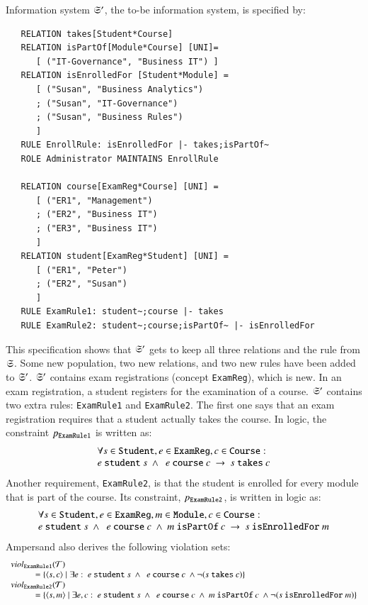 \documentclass{elsarticle}
\begin{document}
   Information system $\mathfrak{S}'$, the to-be information system, is specified by:
\begin{verbatim}
   RELATION takes[Student*Course]
   RELATION isPartOf[Module*Course] [UNI]=
      [ ("IT-Governance", "Business IT") ]
   RELATION isEnrolledFor [Student*Module] =
      [ ("Susan", "Business Analytics")
      ; ("Susan", "IT-Governance")
      ; ("Susan", "Business Rules")
      ]
   RULE EnrollRule: isEnrolledFor |- takes;isPartOf~
   ROLE Administrator MAINTAINS EnrollRule
   
   RELATION course[ExamReg*Course] [UNI] =
      [ ("ER1", "Management")
      ; ("ER2", "Business IT")
      ; ("ER3", "Business IT")
      ]
   RELATION student[ExamReg*Student] [UNI] =
      [ ("ER1", "Peter")
      ; ("ER2", "Susan")
      ]
   RULE ExamRule1: student~;course |- takes
   RULE ExamRule2: student~;course;isPartOf~ |- isEnrolledFor
\end{verbatim}
   This specification shows that $\mathfrak{S}'$ gets to keep all three relations and the rule from $\mathfrak{S}$.
   Some new population, two new relations, and two new rules have been added to $\mathfrak{S}'$.
   $\mathfrak{S}'$ contains exam registrations (concept \verb-ExamReg-), which is new.
   In an exam registration, a student registers for the examination of a course.
   $\mathfrak{S}'$ contains two extra rules: \verb-ExamRule1- and \verb-ExamRule2-.
   The first one says that an exam registration requires that a student actually takes the course.
   In logic, the constraint $p_{\tt ExamRule1}$ is written as:
\[\begin{array}{l}\forall s\in\text{\tt Student}, e\in\text{\tt ExamReg}, c\in\text{\tt Course}:\\
   e\ \text{\tt student}\ s\ \wedge\ \ e\ \text{\tt course}\ c\ \rightarrow\ s\ \text{\tt takes}\ c\\
\end{array}\]
   Another requirement, \verb-ExamRule2-, is that the student is enrolled for every module that is part of the course.
   Its constraint, $p_{\tt ExamRule2}$, is written in logic as:
\[\begin{array}{l}\forall s\in\text{\tt Student}, e\in\text{\tt ExamReg}, m\in\text{\tt Module}, c\in\text{\tt Course}:\\
   e\ \text{\tt student}\ s\ \wedge\ \ e\ \text{\tt course}\ c\ \wedge\ m\ \text{\tt isPartOf}\ c\ \rightarrow\ s\ \text{\tt isEnrolledFor}\ m
\end{array}\]
   Ampersand also derives the following violation sets:
\[\begin{array}{l}
   \viol{\text{\tt ExamRule1}}{\triples}\\
   \hspace{1cm}=\{\pair{s}{c}\mid\exists e:\ e\ \text{\tt student}\ s\ \wedge\ \ e\ \text{\tt course}\ c\ \wedge\neg(s\ \text{\tt takes}\ c)\}\\
   \viol{\text{\tt ExamRule2}}{\triples}\\
   \hspace{1cm}=\{\pair{s}{m}\mid\exists e,c:\ e\ \text{\tt student}\ s\ \wedge\ \ e\ \text{\tt course}\ c\ \wedge\ m\ \text{\tt isPartOf}\ c\ \wedge\neg(s\ \text{\tt isEnrolledFor}\ m)\}
\end{array}\]
\end{document}
